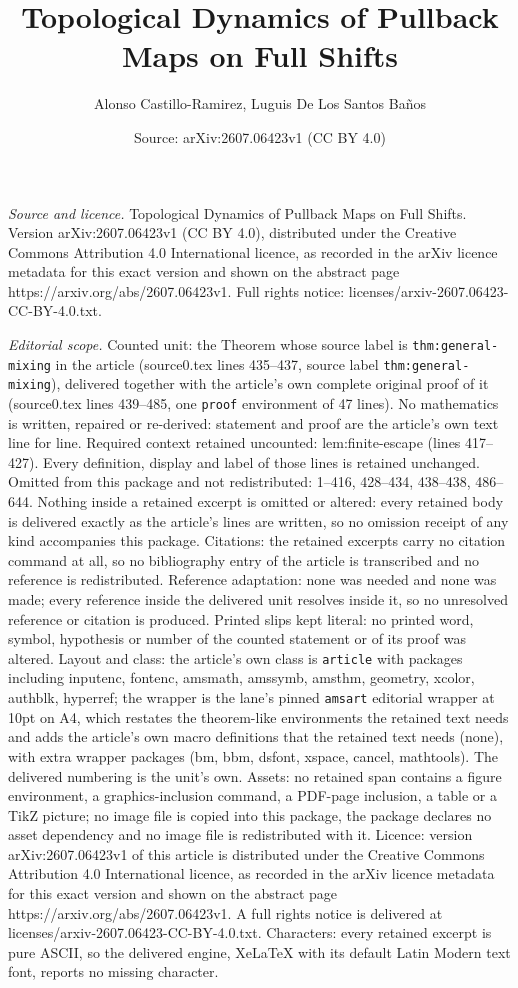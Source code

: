 \documentclass[10pt,a4paper]{amsart}
\title[Topological Dynamics of Pullback Maps on Full Shifts]{Topological Dynamics of Pullback Maps on Full Shifts}
\author{Alonso Castillo-Ramirez, Luguis De Los Santos Ba\~nos}
\date{Source: arXiv:2607.06423v1 (CC BY 4.0)}
\begin{document}
\maketitle

\noindent\emph{Source and licence.} Topological Dynamics of Pullback Maps on Full Shifts. Version arXiv:2607.06423v1 (CC BY 4.0), distributed under the Creative Commons Attribution 4.0 International licence, as recorded in the arXiv licence metadata for this exact version and shown on the abstract page https://arxiv.org/abs/2607.06423v1. Full rights notice: licenses/arxiv-2607.06423-CC-BY-4.0.txt.\par\smallskip

\noindent\textit{Editorial scope.} Counted unit: the Theorem whose source label is \texttt{thm:general-mixing} in the article (source0.tex lines 435--437, source label \texttt{thm:general-mixing}), delivered together with the article's own complete original proof of it (source0.tex lines 439--485, one \texttt{proof} environment of 47 lines). No mathematics is written, repaired or re-derived: statement and proof are the article's own text line for line. Required context retained uncounted: lem:finite-escape (lines 417--427). Every definition, display and label of those lines is retained unchanged. Omitted from this package and not redistributed: 1--416, 428--434, 438--438, 486--644. Nothing inside a retained excerpt is omitted or altered: every retained body is delivered exactly as the article's lines are written, so no omission receipt of any kind accompanies this package. Citations: the retained excerpts carry no citation command at all, so no bibliography entry of the article is transcribed and no reference is redistributed. Reference adaptation: none was needed and none was made; every reference inside the delivered unit resolves inside it, so no unresolved reference or citation is produced. Printed slips kept literal: no printed word, symbol, hypothesis or number of the counted statement or of its proof was altered. Layout and class: the article's own class is \texttt{article} with packages including inputenc, fontenc, amsmath, amssymb, amsthm, geometry, xcolor, authblk, hyperref; the wrapper is the lane's pinned \texttt{amsart} editorial wrapper at 10pt on A4, which restates the theorem-like environments the retained text needs and adds the article's own macro definitions that the retained text needs (none), with extra wrapper packages (bm, bbm, dsfont, xspace, cancel, mathtools). The delivered numbering is the unit's own. Assets: no retained span contains a figure environment, a graphics-inclusion command, a PDF-page inclusion, a table or a TikZ picture; no image file is copied into this package, the package declares no asset dependency and no image file is redistributed with it. Licence: version arXiv:2607.06423v1 of this article is distributed under the Creative Commons Attribution 4.0 International licence, as recorded in the arXiv licence metadata for this exact version and shown on the abstract page https://arxiv.org/abs/2607.06423v1. A full rights notice is delivered at licenses/arxiv-2607.06423-CC-BY-4.0.txt. Characters: every retained excerpt is pure ASCII, so the delivered engine, XeLaTeX with its default Latin Modern text font, reports no missing character.
\end{document}
